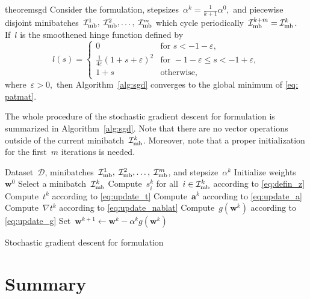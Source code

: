 \begin{restatable}{theorem}{sgd}\label{thm:sgd}
  Consider the \PatMat formulation, stepsizes~$\alpha^k = \frac{1}{k+1}\alpha^0,$ and piecewise disjoint minibatches~$\mathcal{I}_{\text{mb}}^1, \; \mathcal{I}_{\text{mb}}^2, \ldots, \; \mathcal{I}_{\text{mb}}^m$ which cycle periodically~$\mathcal{I}_{\text{mb}}^{k+m} = \mathcal{I}_{\text{mb}}^k$. If~$l$ is the smoothened hinge function defined by
  \begin{equation}\label{eq: smooth hinge}
    l(s) = \begin{cases}
      0 & \text{for } s < -1 - \varepsilon, \\
      \frac{1}{4\varepsilon}(1 + s + \varepsilon)^2 & \text{for } - 1 - \varepsilon \leq s < - 1 + \varepsilon, \\
      1 + s & \text{otherwise,}
    \end{cases}
  \end{equation}
  where~$\varepsilon > 0,$ then Algorithm~\ref{alg:sgd} converges to the global minimum of \eqref{eq: patmat}.
\end{restatable}

The whole procedure of the stochastic gradient descent for \PatMat formulation is summarized in Algorithm~\ref{alg:sgd}. Note that there are no vector operations outside of the current minibatch~$\mathcal{I}_{\text{mb}}^k$. Moreover, note that a proper initialization for the first~$m$ iterations is needed.

\begin{algorithm}
  \begin{algorithmic}[1]
    \Require Dataset~$\mathcal{D}$, minibatches~$\mathcal{I}_{\text{mb}}^1,\; \mathcal{I}_{\text{mb}}^2, \ldots, \; \mathcal{I}_{\text{mb}}^m$, and stepsize~$\alpha^k$
    \State Initialize weights~$\bm{w}^0$
    \State Select a minibatch~$\mathcal{I}_{\text{mb}}^k$
    \State Compute~$s_i^k$ for all~$i \in \mathcal{I}_{\text{mb}}^k$ according to \eqref{eq:defin_z}
    \State Compute~$t^k$ according to \eqref{eq:update_t}
    \State Compute~$\bm{a}^k$ according to \eqref{eq:update_a}
    \State Compute~$\nabla t^k$ according to \eqref{eq:update_nablat}
    \State Compute~$g(\bm{w}^k)$ according to \eqref{eq:update_g}
    \State Set~$\bm{w}^{k+1} \gets \bm{w}^k - \alpha^k g(\bm{w}^k)$
    \EndFor
  \end{algorithmic}
  \caption{Stochastic gradient descent for \PatMat formulation}
  \label{alg:sgd}
\end{algorithm}

\section{Summary}

